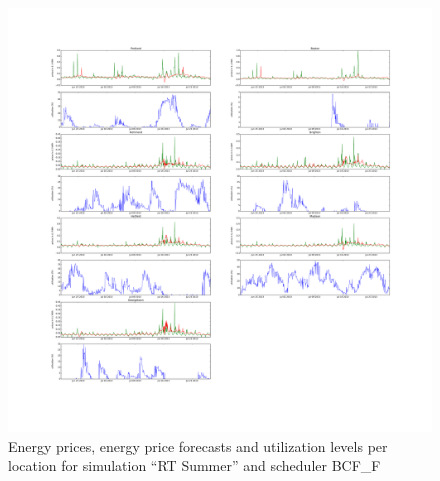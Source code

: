 \begin{figure}[htbp]
	\centering
	\vspace*{-0.6in}
	\hspace*{-1.4in}
		\includegraphics[width=1.60\textwidth]{figures/appendix_simulation_results/RT_Summer_scenario_3.pdf}
	\vspace*{-1.0in}
	\caption{Energy prices, energy price forecasts and utilization levels per location for simulation ``RT Summer'' and scheduler BCF\_F}
	\label{fig:app_RT_Summer_scenario_3}
\end{figure}

